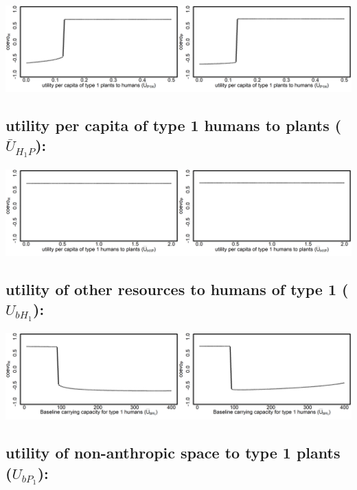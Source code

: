 \documentclass[]{book}
\begin{document}
\includegraphics[width=1\linewidth]{plots/2_onePar-mU.P1H_bifplot-pair}

\hypertarget{utility-per-capita-of-type-1-humans-to-plants-baru_h_1p}{%
\subsection{\texorpdfstring{utility per capita \textbf{of} type 1 humans \textbf{to} plants (\(\bar{U}_{H_{1}P}\)):}{utility per capita of type 1 humans to plants (\textbackslash{}bar\{U\}\_\{H\_\{1\}P\}):}}\label{utility-per-capita-of-type-1-humans-to-plants-baru_h_1p}}

\includegraphics[width=1\linewidth]{plots/2_onePar-mU.H1P_bifplot-pair}

\hypertarget{utility-of-other-resources-to-humans-of-type-1-u_bh_1}{%
\subsection{\texorpdfstring{utility \textbf{of} other resources \textbf{to} humans of type 1 (\(U_{bH_{1}}\)):}{utility of other resources to humans of type 1 (U\_\{bH\_\{1\}\}):}}\label{utility-of-other-resources-to-humans-of-type-1-u_bh_1}}

\includegraphics[width=1\linewidth]{plots/2_onePar-U.bH1_bifplot-pair}

\hypertarget{utility-of-non-anthropic-space-to-type-1-plants-u_bp_1}{%
\subsection{\texorpdfstring{utility \textbf{of} non-anthropic space \textbf{to} type 1 plants (\(U_{bP_{1}}\)):}{utility of non-anthropic space to type 1 plants (U\_\{bP\_\{1\}\}):}}\label{utility-of-non-anthropic-space-to-type-1-plants-u_bp_1}}
\end{document}
